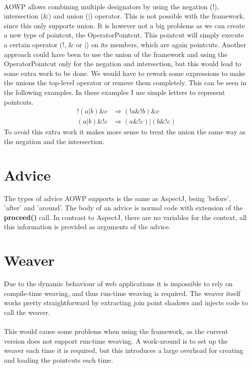\documentclass[a4paper]{report}
\begin{document}
\\
AOWP allows combining multiple designators by using the negation (!), intersection (\&) and union ($|$) operator. This is not possible with the framework, since this only supports union. It is however not a big problems as we can create a new type of pointcut, the OperatorPointcut. This pointcut will simply execute a certain operator (!, \& or $|$) on its members, which are again pointcuts. Another approach could have been to use the union of the framework and using the OperatorPointcut only for the negation and intersection, but this would lead to some extra work to be done. We would have to rework some expressions to make the unions the top-level operator or remove them completely. This can be seen in the following examples. In these examples I use simple letters to represent pointcuts.
\begin{align*}
!\left(a | b\right) \& c & \Rightarrow \left(!a \& !b\right) \& c\\
\left(a | b \right) \& !c & \Rightarrow \left(a \& !c\right) | \left(b \& !c \right)
\end{align*}
To avoid this extra work it makes more sense to treat the union the same way as the negation and the intersection.

\section{Advice}
The types of advice AOWP supports is the same as AspectJ, being 'before', 'after' and 'around'. The body of an advice is normal code with extension of the \textbf{proceed()} call. In contrast to AspectJ, there are no variables for the context, all this information is provided as arguments of the advice.

\section{Weaver}
Due to the dynamic behaviour of web applications it is impossible to rely on compile-time weaving, and thus run-time weaving is required. The weaver itself works pretty straightforward by extracting join point shadows and injects code to call the weaver.\\
\\
This would cause some problems when using the framework, as the current version does not support run-time weaving. A work-around is to set up the weaver each time it is required, but this introduces a large overhead for creating and loading the pointcuts each time.
\end{document}
